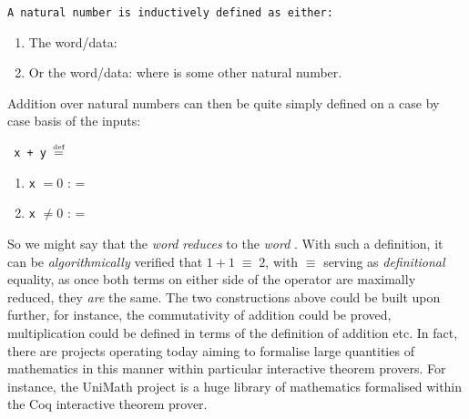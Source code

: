 \documentclass[oneside,12pt]{article}
\newcommand{\eqdef}{$\stackrel{\text{\tiny def}}{=}$}
\begin{document}
\texttt{A natural number is inductively defined as either:}

\begin{enumerate}
\item  The word/data: 
\item  Or the word/data:  where  is some other natural number.
\end{enumerate}


Addition over natural numbers can then be quite simply defined on a case by case basis of the inputs:


\begin{center}
  \begin{minipage}{.75\textwidth}
    \texttt{ x + y  \; \eqdef \,}
    \begin{varwidth}{\textwidth}
    \begin{enumerate}
    \item  \texttt{x} $= 0$ : \;\;\;\;\;  =  
    \item  \texttt{x} $\neq 0$ : \;\;\;\;\;   =  
    \end{enumerate}
    \end{varwidth}
  \end{minipage}
\end{center}

So we might say that the \emph{word}  \emph{reduces} to the \emph{word}  \mbox{}. With such a definition, it can be \emph{algorithmically} verified that $ 1  +  1 \; \equiv \; 2$, with $\equiv$ serving as \emph{definitional} equality, as once both terms on either side of the operator are maximally reduced, they \emph{are} the same. The two constructions above could be built upon further, for instance, the commutativity of addition could be proved, multiplication could be defined in terms of the definition of addition etc. In fact, there are projects operating today aiming to formalise large quantities of mathematics in this manner within particular interactive theorem provers. For instance, the UniMath project is a huge library of mathematics formalised within the Coq interactive theorem prover.
\end{document}
